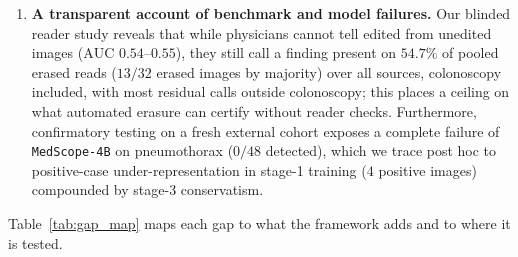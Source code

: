 \documentclass{article} %
\begin{document}
\begin{enumerate}[leftmargin=*,nosep]
    \item \textbf{A transparent account of benchmark and model failures.} Our blinded reader study reveals that while physicians cannot tell edited from unedited images ($\text{AUC } 0.54\text{--}0.55$), they still call a finding present on $54.7\%$ of pooled erased reads ($13/32$ erased images by majority) over all sources, colonoscopy included, with most residual calls outside colonoscopy; this places a ceiling on what automated erasure can certify without reader checks. Furthermore, confirmatory testing on a fresh external cohort exposes a complete failure of \texttt{MedScope-4B} on pneumothorax ($0/48$ detected), which we trace post hoc to positive-case under-representation in stage-1 training ($4$ positive images) compounded by stage-3 conservatism.
\end{enumerate}

Table~\ref{tab:gap_map} maps each gap to what the framework adds and to where it is tested.
\end{document}
